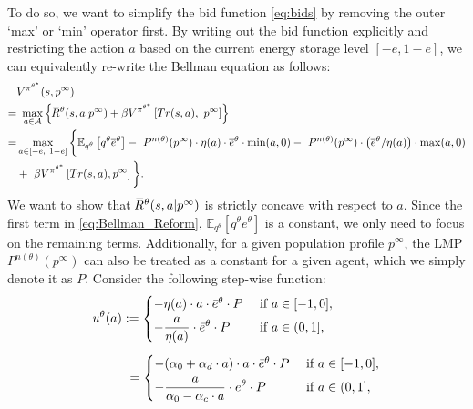 \documentclass{article}
\theoremstyle{definition}
\theoremstyle{plain}
\newcommand{\overbar}[1]{\mkern1.5mu\overline{\mkern-3.0mu#1\mkern-1mu}\mkern 1.5mu}
\begin{document}

	To do so, we want to simplify the bid function \eqref{eq:bids} by removing the outer `max' or `min' operator first. By writing out the bid function explicitly and restricting the action $a$ based on the current energy storage level $[-e, 1-e]$, we can equivalently re-write the Bellman equation as follows:
	\begin{align}
	& V^{\pi^{\theta^*}}(s, p^{\infty})  \nonumber \\
    = &\ \max_{a\in \mathcal{A}} \left\{\overbar{R}^{\theta}(s, a|p^{\infty}) + \beta  V^{\pi^{\theta^*}}\left[Tr(s,a),\ p^{\infty}\right]\right\} \nonumber \\
	= &   \max_{a\in [-e,\ 1-e]} \bigg\{\mathbb{E}_{q^{\theta}} \left[q^{\theta}\overline{e}^{\theta}\right] -\ {P}^{n(\theta)}(p^{\infty}) \cdot 
	\eta(a)\cdot\overline{e}^{\theta} \cdot \min(a, 0)  -\ {P}^{n(\theta)}(p^{\infty})  \cdot 
	\left(\overline{e}^{\theta}/\eta(a)\right) \cdot \max(a, 0) \nonumber \\
	& +\ \beta V^{\pi^{\theta^*}}\left[Tr(s,a), p^{\infty}\right]\bigg\}.  \label{eq:Bellman_Reform}
	\end{align}
	We want to show that $\overbar{R}^{\theta}(s, a|p^{\infty})$ is strictly concave with respect to $a$. Since the first term in \eqref{eq:Bellman_Reform}, $\mathbb{E}_{q^{\theta}} [q^{\theta}\overline{e}^{\theta}]$ is a constant, we only need to focus on the remaining terms. Additionally, for a given population profile $p^{\infty}$, the LMP ${P}^{n(\theta)}(p^{\infty})$ can also be treated as a constant for a given agent, which we simply denote it as ${P}$. Consider the following step-wise function:
	\begin{align}\label{eq:u_function}
	u^{\theta}(a)&:= \begin{cases}
	-\eta(a) \cdot a \cdot \Bar{e}^{\theta} \cdot {P} &\text{ if } a \in[-1,0],\\[3pt]
	- \displaystyle\frac{a}{\eta(a)}\cdot   \Bar{e}^{\theta} \cdot {P} &\text{ if } a \in (0,1],
	\end{cases} \\[5pt]
	& \ =  \begin{cases}
	-(\alpha_0 + \alpha_d \cdot a)  \cdot a \cdot \Bar{e}^{\theta} \cdot {P}&\text{ if } a \in[-1,0],\\[3pt]
	-  \displaystyle \frac{a}{\alpha_0 - \alpha_c \cdot a} \cdot \Bar{e}^{\theta}\cdot  {P} &\text{ if } a \in (0,1],
	\end{cases}  \label{eq:reward_no_e}
	\end{align}
\end{document}
